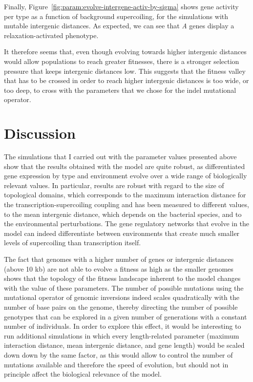 Finally, Figure~\ref{fig:param:evolve-intergene-activ-by-sigma} shows gene activity per type as a function of background supercoiling, for the simulations with mutable intergenic distances.
As expected, we can see that \emph{A} genes display a relaxation-activated phenotype.

It therefore seems that, even though evolving towards higher intergenic distances would allow populations to reach greater fitnesses, there is a stronger selection pressure that keeps intergenic distances low.
This suggests that the fitness valley that has to be crossed in order to reach higher intergenic distances is too wide, or too deep, to cross with the parameters that we chose for the indel mutational operator.



\section{Discussion}

The simulations that I carried out with the parameter values presented above show that the results obtained with the model are quite robust, as differentiated gene expression by type and environment evolve over a wide range of biologically relevant values.
In particular, results are robust with regard to the size of topological domains, which corresponds to the maximum interaction distance for the transcription-supercoiling coupling and has been measured to different values, to the mean intergenic distance, which depends on the bacterial species, and to the environmental perturbations.
The gene regulatory networks that evolve in the model can indeed differentiate between environments that create much smaller levels of supercoiling than transcription itself.

The fact that genomes with a higher number of genes or intergenic distances (above 10 kb) are not able to evolve a fitness as high as the smaller genomes shows that the topology of the fitness landscape inherent to the model changes with the value of these parameters.
The number of possible mutations using the mutational operator of genomic inversions indeed scales quadratically with the number of base pairs on the genome, thereby directing the number of possible genotypes that can be explored in a given number of generations with a constant number of individuals.
In order to explore this effect, it would be interesting to run additional simulations in which every length-related parameter  (maximum interaction distance, mean intergenic distance, and gene length) would be scaled down down by the same factor, as this would allow to control the number of mutations available and therefore the speed of evolution, but should not in principle affect the biological relevance of the model.

